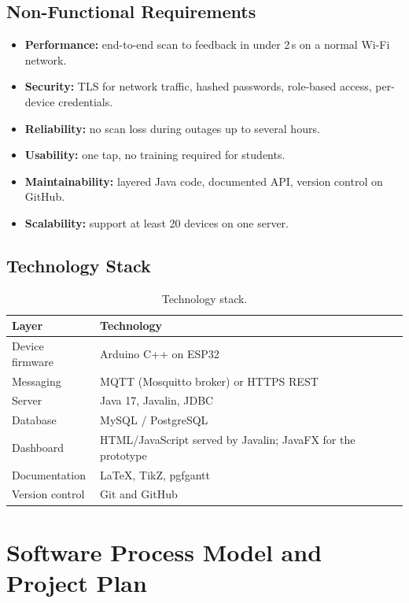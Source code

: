 \documentclass[11pt,a4paper]{article}
\begin{document}
\subsection{Non-Functional Requirements}
\begin{itemize}[noitemsep]
  \item \textbf{Performance:} end-to-end scan to feedback in under 2\,s on a normal Wi-Fi network.
  \item \textbf{Security:} TLS for network traffic, hashed passwords, role-based access, per-device credentials.
  \item \textbf{Reliability:} no scan loss during outages up to several hours.
  \item \textbf{Usability:} one tap, no training required for students.
  \item \textbf{Maintainability:} layered Java code, documented API, version control on GitHub.
  \item \textbf{Scalability:} support at least 20 devices on one server.
\end{itemize}
 
\subsection{Technology Stack}
\begin{table}[H]
\centering
\small
\begin{tabular}{ll}
\toprule
\textbf{Layer} & \textbf{Technology}\\
\midrule
Device firmware & Arduino C++ on ESP32\\
Messaging & MQTT (Mosquitto broker) or HTTPS REST\\
Server & Java 17, Javalin, JDBC\\
Database & MySQL / PostgreSQL\\
Dashboard & HTML/JavaScript served by Javalin; JavaFX for the prototype\\
Documentation & \LaTeX, TikZ, pgfgantt\\
Version control & Git and GitHub\\
\bottomrule
\end{tabular}
\caption{Technology stack.}
\end{table}
 
\section{Software Process Model and Project Plan}
\end{document}
